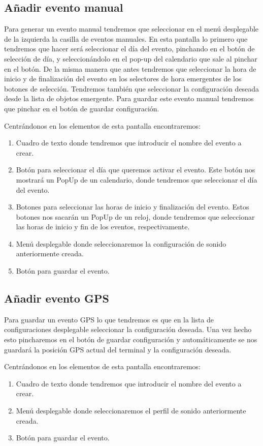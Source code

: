 \subsection{Añadir evento manual}

Para generar un evento manual tendremos que seleccionar en el menú desplegable de la izquierda la casilla de eventos manuales.
En esta pantalla lo primero que tendremos que hacer será seleccionar el día del evento, pinchando en el botón de selección de día, y seleccionándolo en el pop-up del calendario que sale al pinchar en el botón.
De la misma manera que antes tendremos que seleccionar la hora de inicio y de finalización del evento en los selectores de hora emergentes de los botones de selección.
Tendremos también que seleccionar la configuración deseada desde la lista de objetos emergente.
Para guardar este evento manual tendremos que pinchar en el botón de guardar configuración.

Centrándonos en los elementos de esta pantalla encontraremos:
\begin{enumerate}
\item Cuadro de texto donde tendremos que introducir el nombre del evento a crear.
\item Botón para seleccionar el día que queremos activar el evento. Este botón nos mostrará un PopUp de un calendario, donde tendremos que seleccionar el día del evento.
\item Botones para seleccionar las horas de inicio y finalización del evento. Estos botones nos sacarán un PopUp de un reloj, donde tendremos que seleccionar las horas de inicio y fin de los eventos, respectivamente.
\item Menú desplegable donde seleccionaremos la configuración de sonido anteriormente creada.
\item Botón para guardar el evento.
\end{enumerate}


\subsection{Añadir evento GPS}

Para guardar un evento GPS lo que tendremos es que en la lista de configuraciones desplegable seleccionar la configuración deseada.
Una vez hecho esto pincharemos en el botón de guardar configuración y automáticamente se nos guardará la posición GPS actual del terminal y la configuración deseada.

Centrándonos en los elementos de esta pantalla encontraremos:
\begin{enumerate}
\item Cuadro de texto donde tendremos que introducir el nombre del evento a crear.
\item Menú desplegable donde seleccionaremos el perfil de sonido anteriormente creada.
\item Botón para guardar el evento.
\end{enumerate}


